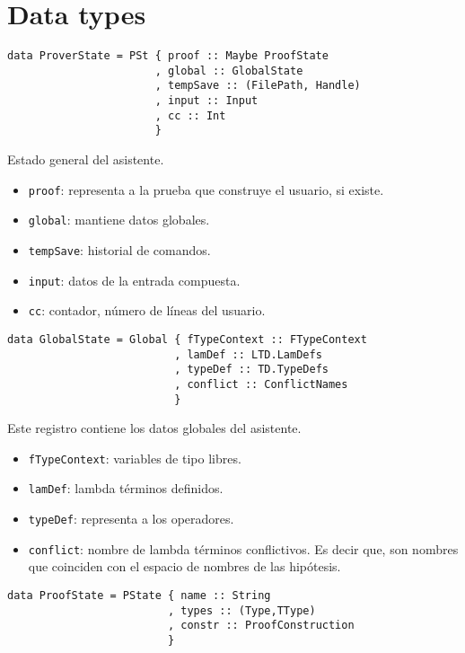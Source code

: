 \documentclass[a4paper,11pt]{article}
\theoremstyle{definition}
\begin{document}
\section{Data types}

\begin{verbatim}
data ProverState = PSt { proof :: Maybe ProofState
                       , global :: GlobalState
                       , tempSave :: (FilePath, Handle)
                       , input :: Input
                       , cc :: Int
                       }
\end{verbatim}

Estado general del asistente.
\begin{itemize}
  \item \texttt{proof}: representa a la prueba que construye el usuario, si existe.
  \item \texttt{global}: mantiene datos globales.
  \item \texttt{tempSave}: historial de comandos.
  \item \texttt{input}: datos de la entrada compuesta.
  \item \texttt{cc}: contador, número de líneas del usuario. 
\end{itemize}

\begin{verbatim}
data GlobalState = Global { fTypeContext :: FTypeContext
                          , lamDef :: LTD.LamDefs
                          , typeDef :: TD.TypeDefs
                          , conflict :: ConflictNames
                          }
\end{verbatim}

Este registro contiene los datos globales del asistente.
\begin{itemize}
  \item \texttt{fTypeContext}: variables de tipo libres.
  \item \texttt{lamDef}: lambda términos definidos.
  \item \texttt{typeDef}: representa a los operadores.
  \item \texttt{conflict}: nombre de lambda términos conflictivos. Es decir que, son nombres
    que coinciden con el espacio de nombres de las hipótesis.
\end{itemize}

\begin{verbatim}
data ProofState = PState { name :: String
                         , types :: (Type,TType)
                         , constr :: ProofConstruction
                         }
\end{verbatim}
\end{document}
